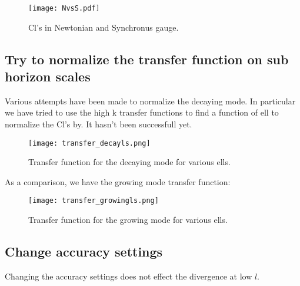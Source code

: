\documentclass[12pt]{article}
\numberwithin{equation}{section}
\begin{document}
\begin{figure}[h!]
\begin{center}
\texttt{[image: NvsS.pdf]}
\vspace{5mm}
\caption{Cl's in Newtonian and Synchronus gauge.}
\label{NvsS}
\end{center}
\end{figure}

\newpage

\subsection{Try to normalize the transfer function on sub horizon scales}

Various attempts have been made to normalize the decaying mode. In particular we have tried to use the high k transfer functions to find a function of ell to normalize the Cl's by. It hasn't been successfull yet. 

\begin{figure}[h!]
\begin{center}
\texttt{[image: transfer\_decayls.png]}
\vspace{5mm}
\caption{Transfer function for the decaying mode for various ells.}
\label{transfer_decay}
\end{center}
\end{figure}

As a comparison, we have the growing mode transfer function:

\begin{figure}[h!]
\begin{center}
\texttt{[image: transfer\_growingls.png]}
\vspace{5mm}
\caption{Transfer function for the growing mode for various ells.}
\label{transfer_grow}
\end{center}
\end{figure}

\newpage

\subsection{Change accuracy settings}

Changing the accuracy settings does not effect the divergence at low $l$. 
\end{document}

